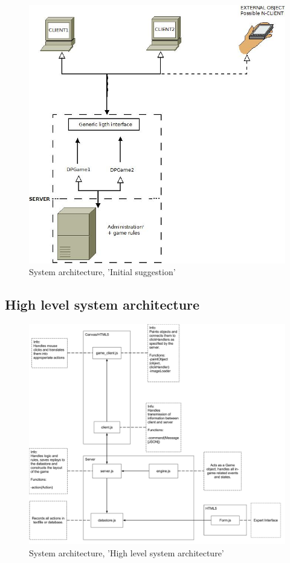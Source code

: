 \begin{figure}[H]
  \centering
    \includegraphics[width=1.0\textwidth]{img/Client-serverarchitecture.jpeg}
  \caption{System architecture, 'Initial suggestion'} 
  \label{fig:initialsuggestion}
\end{figure}



\subsection{High level system architecture}

\begin{figure}[H]
  \centering
    \includegraphics[width=1.0\textwidth]{img/highlevelarch.png}
  \caption{System architecture, 'High level system architecture'} 
  \label{fig:highsysarch}
\end{figure}

